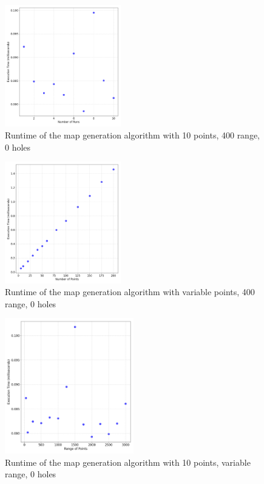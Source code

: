 \documentclass[final]{cmpreport_02}
\begin{document}
\begin{figure}[h!]
	\centering
	\includegraphics[width=0.45\textwidth]{./images/mapGenBaselineRT.png}
	\caption{Runtime of the map generation algorithm with 10 points, 400 range, 0 holes}
	\label{PE:mg:baselineRT}
\end{figure}


\begin{figure}[h!]
	\centering
	\includegraphics[width=0.45\textwidth]{./images/mapGenPointsRT.png}
	\caption{Runtime of the map generation algorithm with variable points, 400 range, 0 holes}
	\label{PE:mg:points}
\end{figure}


\begin{figure}[h!]
	\centering
	\includegraphics[width=0.5\textwidth]{./images/mapGenRangeRT.png}
	\caption{Runtime of the map generation algorithm with 10 points, variable range, 0 holes}

	\label{PE:mg:range}
\end{figure}
\end{document}
